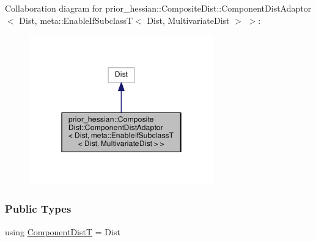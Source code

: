 Collaboration diagram for prior\+\_\+hessian\+:\+:Composite\+Dist\+:\+:Component\+Dist\+Adaptor$<$ Dist, meta\+:\+:Enable\+If\+SubclassT$<$ Dist, Multivariate\+Dist $>$ $>$\+:\nopagebreak
\begin{figure}[H]
\begin{center}
\leavevmode
\includegraphics[width=226pt]{classprior__hessian_1_1CompositeDist_1_1ComponentDistAdaptor_3_01Dist_00_01meta_1_1EnableIfSubcl5d235125336c7b6ed15c6d942684c79c}
\end{center}
\end{figure}
\subsubsection*{Public Types}
\begin{DoxyCompactItemize}
\item 
using \hyperlink{classprior__hessian_1_1CompositeDist_1_1ComponentDistAdaptor_3_01Dist_00_01meta_1_1EnableIfSubcld67d34d533dbae21b9dad35557546eec_a4476c155b4e4d7aaf638a646c22f4ac6}{Component\+DistT} = Dist
\end{DoxyCompactItemize}
